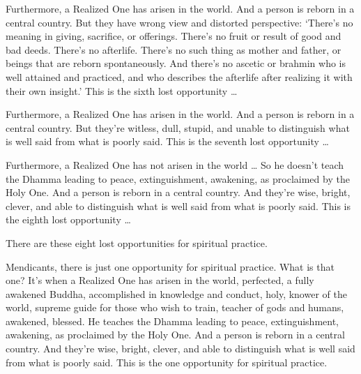 \documentclass[12pt,openany]{book}%
\begin{document}
Furthermore, a Realized One has arisen in the world. And a person is reborn in a central country. But they have wrong view and distorted perspective: ‘There’s no meaning in giving, sacrifice, or offerings. There’s no fruit or result of good and bad deeds. There’s no afterlife. There’s no such thing as mother and father, or beings that are reborn spontaneously. And there’s no ascetic or brahmin who is well attained and practiced, and who describes the afterlife after realizing it with their own insight.’ This is the sixth lost opportunity … 

Furthermore, a Realized One has arisen in the world. And a person is reborn in a central country. But they’re witless, dull, stupid, and unable to distinguish what is well said from what is poorly said. This is the seventh lost opportunity … 

Furthermore, a Realized One has not arisen in the world … So he doesn’t teach the Dhamma leading to peace, extinguishment, awakening, as proclaimed by the Holy One. And a person is reborn in a central country. And they’re wise, bright, clever, and able to distinguish what is well said from what is poorly said. This is the eighth lost opportunity … 

There are these eight lost opportunities for spiritual practice. 

Mendicants, there is just one opportunity for spiritual practice. What is that one? It’s when a Realized One has arisen in the world, perfected, a fully awakened Buddha, accomplished in knowledge and conduct, holy, knower of the world, supreme guide for those who wish to train, teacher of gods and humans, awakened, blessed. He teaches the Dhamma leading to peace, extinguishment, awakening, as proclaimed by the Holy One. And a person is reborn in a central country. And they’re wise, bright, clever, and able to distinguish what is well said from what is poorly said. This is the one opportunity for spiritual practice. 
\end{document}
